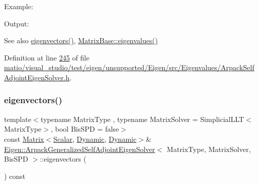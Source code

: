 Example\+: 
\begin{DoxyCodeInclude}
\end{DoxyCodeInclude}
 Output\+: 
\begin{DoxyVerbInclude}
\end{DoxyVerbInclude}


\begin{DoxySeeAlso}{See also}
\hyperlink{class_eigen_1_1_arpack_generalized_self_adjoint_eigen_solver_a183825135568364792a955efc55a0773}{eigenvectors()}, \hyperlink{group___core___module_a30430fa3d5b4e74d312fd4f502ac984d}{Matrix\+Base\+::eigenvalues()} 
\end{DoxySeeAlso}


Definition at line \hyperlink{matio_2visual__studio_2test_2eigen_2unsupported_2_eigen_2src_2_eigenvalues_2_arpack_self_adjoint_eigen_solver_8h_source_l00245}{245} of file \hyperlink{matio_2visual__studio_2test_2eigen_2unsupported_2_eigen_2src_2_eigenvalues_2_arpack_self_adjoint_eigen_solver_8h_source}{matio/visual\+\_\+studio/test/eigen/unsupported/\+Eigen/src/\+Eigenvalues/\+Arpack\+Self\+Adjoint\+Eigen\+Solver.\+h}.

\mbox{\label{class_eigen_1_1_arpack_generalized_self_adjoint_eigen_solver_a183825135568364792a955efc55a0773}} 
\subsubsection{\texorpdfstring{eigenvectors()}{eigenvectors()}\hspace{0.1cm}{\footnotesize\ttfamily [1/2]}}
{\footnotesize\ttfamily template$<$typename Matrix\+Type , typename Matrix\+Solver  = Simplicial\+L\+L\+T$<$\+Matrix\+Type$>$, bool Bis\+S\+PD = false$>$ \\
const \hyperlink{group___core___module_class_eigen_1_1_matrix}{Matrix}$<$\hyperlink{class_eigen_1_1_arpack_generalized_self_adjoint_eigen_solver_ab1182405bfe87a505d4b7a8311c661ec}{Scalar}, \hyperlink{namespace_eigen_ad81fa7195215a0ce30017dfac309f0b2}{Dynamic}, \hyperlink{namespace_eigen_ad81fa7195215a0ce30017dfac309f0b2}{Dynamic}$>$\& \hyperlink{class_eigen_1_1_arpack_generalized_self_adjoint_eigen_solver}{Eigen\+::\+Arpack\+Generalized\+Self\+Adjoint\+Eigen\+Solver}$<$ Matrix\+Type, Matrix\+Solver, Bis\+S\+PD $>$\+::eigenvectors (\begin{DoxyParamCaption}{ }\end{DoxyParamCaption}) const\hspace{0.3cm}{\ttfamily [inline]}}



